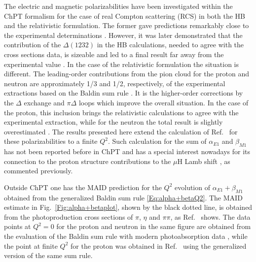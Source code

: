 \documentclass[twocolumn,prc,showpacs,nofootinbib,preprintnumbers,amsmath,amssymb,superscriptaddress]{revtex4-1}
\begin{document}
The electric and magnetic polarizabilities have been investigated within the ChPT formalism for the case of real Compton scattering (RCS) in both the HB and the relativistic formulation. 
The former gave predictions remarkably close to the experimental determinations \cite{Bernard:1991rq,Bernard:1991ru}.
However, it was later demonstrated that the contribution of the $\Delta(1232)$ in the HB calculations, needed to agree with the cross sections data, is sizeable and led to a final result far away from the experimental value \cite{Hemmert:1996rw}.
In the case of the relativistic formulation the situation is different. 
The leading-order contributions from the pion cloud for the proton and neutron are approximately 1/3 and 1/2, respectively, of the experimental extractions based on the Baldin sum rule \cite{Babusci:1997ij}.
It is the higher-order corrections by the $\Delta$ exchange and $\pi\Delta$ loops which improve the overall situation. 
In the case of the proton, this inclusion brings the relativistic calculations to agree with the experimental extraction, while for the neutron the total result is slightly overestimated \cite{Babusci:1997ij}.
The results presented here extend the calculation of Ref.~\cite{Lensky:2009uv} for these polarizabilities to a finite $Q^2$. 
Such calculation for the sum of $\alpha_{E1}$ and $\beta_{M1}$ has not been reported before in ChPT and has a special interest nowadays for its connection to the proton structure contributions to the $\mu$H Lamb shift \cite{Alarcon:2013cba}, as commented previously. 


Outside ChPT one has the MAID prediction \cite{Drechsel:2000ct,Drechsel:1998hk} for the $Q^2$ evolution of $\alpha_{E1}+\beta_{M1}$ obtained from the generalized Baldin sum rule \eqref{Eq:alpha+betaQ2}. 
The MAID estimate \cite{MAID} in Fig.~\ref{Fig:alpha+betaplot}, shown by the black dotted line, is obtained from the photoproduction cross sections of $\pi$, $\eta$ and $\pi \pi$, as Ref.~\cite{Drechsel:2002ar} shows. 
The data points at $Q^2=0$ for the proton and neutron in the same figure are obtained from the evaluation of the Baldin sum rule with modern photoabsorption data \cite{Babusci:1997ij,OlmosdeLeon:2001zn,Gryniuk:2015}, while the point at finite $Q^2$ for the proton was obtained in Ref.~\cite{Liang:2004tk} using the generalized version of the same sum rule.
\end{document}
